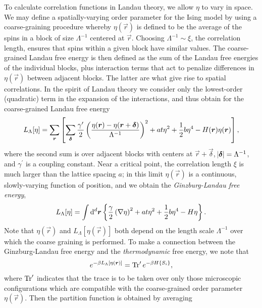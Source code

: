 To calculate correlation functions in Landau theory, we allow $\eta$ to vary in
space. We may define a spatially-varying order parameter for the Ising model by
using a coarse-graining procedure whereby $\eta(\vec{r})$ is defined to be the
average of the spins in a block of size $\Lambda^{-1}$ centered at $\vec{r}$.
Choosing $\Lambda^{-1} \sim \xi$, the correlation length, ensures that spins
within a given block have similar values. The coarse-grained Landau free energy
is then defined as the sum of the Landau free energies of the individual
blocks, plus interaction terms that act to penalize differences in
$\eta(\vec{r})$ between adjacent blocks. The latter are what give rise to
spatial correlations. In the spirit of Landau theory we consider only the
lowest-order (quadratic) term in the expansion of the interactions, and thus
obtain for the coarse-grained Landau free energy
\begin{equation}
  L_{\Lambda}[\eta] =
  \sum_{\bm{r}}\left[
    \sum_{\bm{\delta}} \frac{\gamma^{\prime}}{2}
      \left(\frac{\eta(\bm{r}) - \eta(\bm{r}+\bm{\delta})}{\Lambda^{-1}}\right)^2
    + a t \eta^2 + \frac{1}{2} b \eta^4 - H(\bm{r}) \eta(\bm{r})
  \right],
\end{equation}
where the second sum is over adjacent blocks with centers at
$\vec{r}+\vec{\delta}$, $\abs{\bm{\delta}}=\Lambda^{-1}$, and
$\gamma^{\prime}$ is a coupling constant. Near a critical point, the
correlation length $\xi$ is much larger than the lattice spacing $a$; in this
limit $\eta(\vec{r})$ is a continuous, slowly-varying function of position, and
we obtain the \emph{Ginzburg-Landau free energy},
\begin{equation}
  L_{\Lambda}[\eta]
  = \int\dif^d \vec{r}
  \cbr{\frac{\gamma}{2}\del{
      \nabla\eta}^2 + a t \eta^2 + \frac{1}{2} b \eta^4 - H \eta}.
  \label{eq:landau-cg}
\end{equation}
Note that $\eta(\vec{r})$ and $L_{\Lambda}[\eta(\vec{r})]$ both depend on the
length scale $\Lambda^{-1}$ over which the coarse graining is performed. To
make a connection between the Ginzburg-Landau free energy and the
\emph{thermodynamic} free energy, we note that
\begin{equation}
  e^{-\beta L_{\Lambda}[\eta(\vec{r})]} = \Tr^{\prime} e^{-\beta H \cbr{S_i}},
\end{equation}
where $\operatorname{Tr}^{\prime}$ indicates that the trace is to be taken over only those
microscopic configurations which are compatible with the coarse-grained order
parameter $\eta(\vec{r})$. Then the partition function is obtained by averaging

